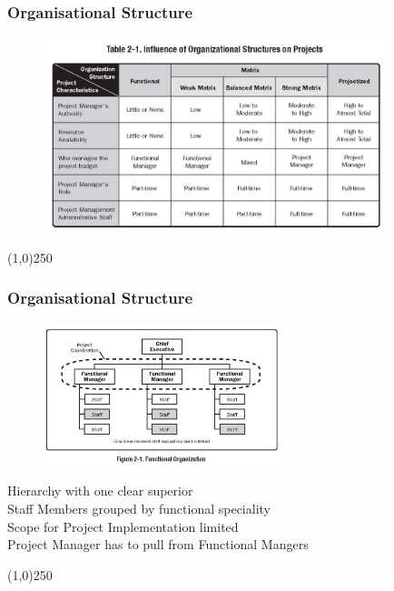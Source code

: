 \begin{frame}
\frametitle{Organisational Structure}
 \begin{figure}
 	\centering
 		\includegraphics[width = 10cm]{images/tbl2-1.jpg}
 	\label{tbl:2-1b}
 \end{figure}
\end{frame}
\begin{center}\line(1,0){250}\end{center}



\begin{frame}
\frametitle{Organisational Structure}
\begin{figure}
	\centering
		\includegraphics[width = 7cm]{images/Fig2-1.jpg}
	\label{fig:2-1}
\end{figure}Hierarchy with one clear superior\\
Staff Members grouped by functional speciality\\
Scope for Project Implementation limited\\
Project Manager has to pull from Functional Mangers\\
\end{frame}
\begin{center}\line(1,0){250}\end{center}



